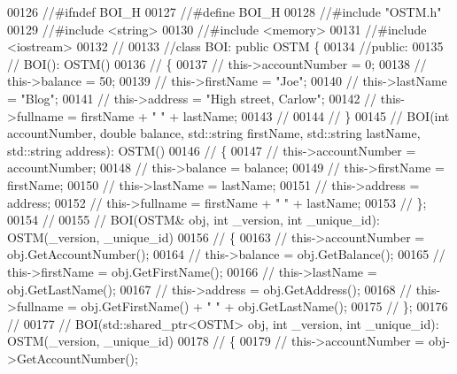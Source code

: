 \begin{DoxyCode}
00126 \textcolor{comment}{//#ifndef BOI\_H}
00127 \textcolor{comment}{//#define BOI\_H}
00128 \textcolor{comment}{//#include "OSTM.h"}
00129 \textcolor{comment}{//#include <string>}
00130 \textcolor{comment}{//#include <memory>}
00131 \textcolor{comment}{//#include <iostream>}
00132 \textcolor{comment}{//}
00133 \textcolor{comment}{//class BOI: public OSTM \{}
00134 \textcolor{comment}{//public:}
00135 \textcolor{comment}{//    BOI(): OSTM()}
00136 \textcolor{comment}{//    \{}
00137 \textcolor{comment}{//        this->accountNumber = 0;}
00138 \textcolor{comment}{//        this->balance = 50;}
00139 \textcolor{comment}{//        this->firstName = "Joe";}
00140 \textcolor{comment}{//        this->lastName = "Blog";}
00141 \textcolor{comment}{//        this->address = "High street, Carlow";}
00142 \textcolor{comment}{//        this->fullname = firstName + " " + lastName;}
00143 \textcolor{comment}{//        }
00144 \textcolor{comment}{//    \}}
00145 \textcolor{comment}{//    BOI(int accountNumber, double balance, std::string firstName, std::string lastName, std::string
       address): OSTM()}
00146 \textcolor{comment}{//    \{}
00147 \textcolor{comment}{//        this->accountNumber = accountNumber;}
00148 \textcolor{comment}{//        this->balance = balance;}
00149 \textcolor{comment}{//        this->firstName = firstName;}
00150 \textcolor{comment}{//        this->lastName = lastName;}
00151 \textcolor{comment}{//        this->address = address;}
00152 \textcolor{comment}{//        this->fullname = firstName + " " + lastName;}
00153 \textcolor{comment}{//    \};}
00154 \textcolor{comment}{//    }
00155 \textcolor{comment}{//     BOI(OSTM& obj, int \_version, int \_unique\_id): OSTM(\_version, \_unique\_id)}
00156 \textcolor{comment}{//    \{}
00163 \textcolor{comment}{}\textcolor{comment}{//          this->accountNumber = obj.GetAccountNumber();}
00164 \textcolor{comment}{//        this->balance = obj.GetBalance();}
00165 \textcolor{comment}{//        this->firstName = obj.GetFirstName();}
00166 \textcolor{comment}{//        this->lastName = obj.GetLastName();}
00167 \textcolor{comment}{//        this->address = obj.GetAddress();}
00168 \textcolor{comment}{//        this->fullname = obj.GetFirstName() + " " + obj.GetLastName(); }
00175 \textcolor{comment}{}\textcolor{comment}{//    \};}
00176 \textcolor{comment}{//    }
00177 \textcolor{comment}{//     BOI(std::shared\_ptr<OSTM> obj, int \_version, int \_unique\_id): OSTM(\_version, \_unique\_id)}
00178 \textcolor{comment}{//    \{}
00179 \textcolor{comment}{//        this->accountNumber = obj->GetAccountNumber();}

\end{DoxyCode}
